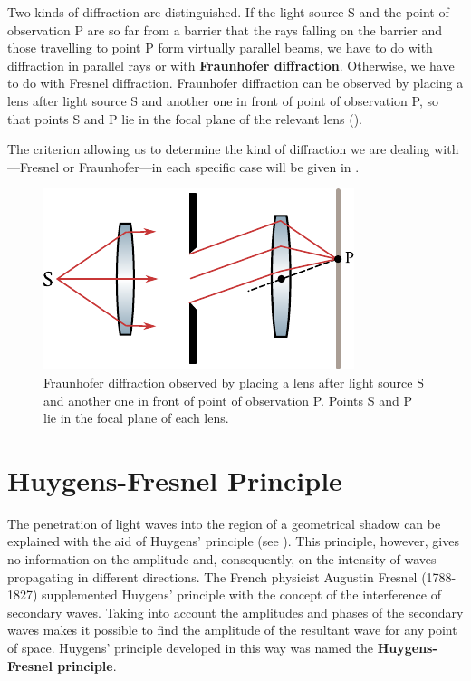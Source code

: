 Two kinds of diffraction are distinguished.
If the light source S and the point of observation P are so far from a barrier that the rays falling on the barrier and those travelling to point P form virtually parallel beams, we have to do with diffraction in parallel rays or with \textbf{Fraunhofer diffraction}.
Otherwise, we have to do with Fresnel diffraction.
Fraunhofer diffraction can be observed by placing a lens after light source S and another one in front of point of observation P, so that points S and P lie in the focal plane of the relevant lens
().

The criterion allowing us to determine the kind of diffraction we are dealing with---Fresnel or Fraunhofer---in each specific case will be given in .

\begin{figure}[t]
	\begin{center}
		\includegraphics[scale=1]{figures/ch_18/fig_18_1.pdf}
        \caption[]{Fraunhofer diffraction observed by placing a lens after light source S and another one in front of point of observation P. Points S and P lie in the focal plane of each lens.}
		\label{fig:18_1}
	\end{center}
	\vspace{-0.8cm}
\end{figure}

\section{Huygens-Fresnel Principle}\label{sec:18_2}

The penetration of light waves into the region of a geometrical shadow can be explained with the aid of Huygens' principle (see ).
This principle, however, gives no information on the amplitude and, consequently, on the intensity of waves propagating in different directions.
The French physicist Augustin Fresnel (1788-1827) supplemented Huygens' principle with the concept of the interference of secondary waves.
Taking into account the amplitudes and phases of the secondary waves makes it possible to find the amplitude of the resultant wave for any point of
space.
Huygens' principle developed in this way was named the \textbf{Huygens-Fresnel principle}.

